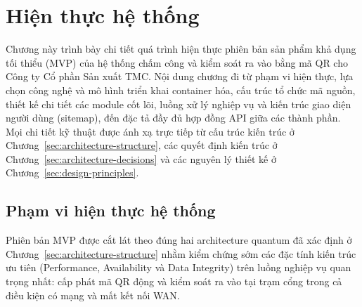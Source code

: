 \section{Hiện thực hệ thống}\label{sec:system-implementation}

Chương này trình bày chi tiết quá trình hiện thực phiên bản sản phẩm khả dụng tối thiểu (MVP) của hệ
thống chấm công và kiểm soát ra vào bằng mã QR cho Công ty Cổ phần Sản xuất TMC. Nội dung chương đi
từ phạm vi hiện thực, lựa chọn công nghệ và mô hình triển khai container hóa, cấu trúc tổ chức mã
nguồn, thiết kế chi tiết các module cốt lõi, luồng xử lý nghiệp vụ và kiến trúc giao diện người dùng
(sitemap), đến đặc tả đầy đủ hợp đồng API giữa các thành phần. Mọi chi tiết kỹ thuật được ánh xạ trực
tiếp từ cấu trúc kiến trúc ở Chương~\ref{sec:architecture-structure}, các quyết định kiến trúc ở
Chương~\ref{sec:architecture-decisions} và các nguyên lý thiết kế ở
Chương~\ref{sec:design-principles}.

\subsection{Phạm vi hiện thực hệ thống}\label{sec:implementation-scope}

Phiên bản MVP được cắt lát theo đúng hai architecture quantum đã xác định ở
Chương~\ref{sec:architecture-structure} nhằm kiểm chứng sớm các đặc tính kiến trúc ưu tiên
(Performance, Availability và Data Integrity) trên luồng nghiệp vụ quan trọng nhất: cấp phát mã QR
động và kiểm soát ra vào tại trạm cổng trong cả điều kiện có mạng và mất kết nối WAN.

